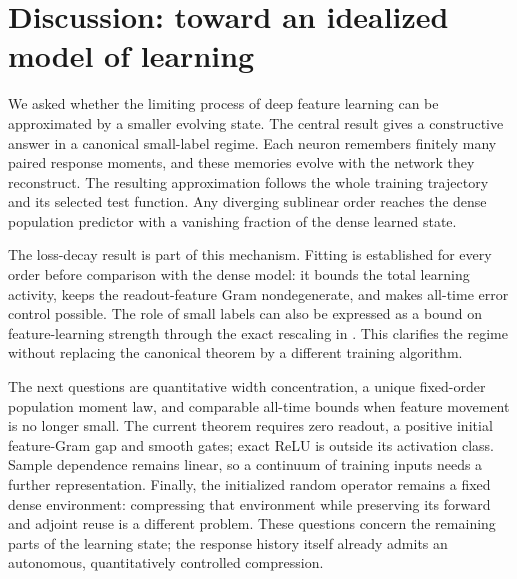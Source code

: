 \documentclass[11pt]{article}
\theoremstyle{definition}
\theoremstyle{remark}
\begin{document}
\section{Discussion: toward an idealized model of learning}

We asked whether the limiting process of deep feature learning can be
approximated by a smaller evolving state.  The central result gives a
constructive answer in a canonical small-label regime.  Each neuron remembers
finitely many paired response moments, and these memories evolve with the
network they reconstruct.  The resulting approximation follows the whole
training trajectory and its selected test function.  Any diverging sublinear
order reaches the dense population predictor with a vanishing fraction of
the dense learned state.

The loss-decay result is part of this mechanism.  Fitting is established for
every order before comparison with the dense model: it bounds the total
learning activity, keeps the readout-feature Gram nondegenerate, and makes
all-time error control possible.  The role of small labels can also be
expressed as a bound on feature-learning strength through the exact
rescaling in .  This clarifies the regime without replacing
the canonical theorem by a different training algorithm.

The next questions are quantitative width concentration, a unique
fixed-order population moment law, and comparable all-time bounds when
feature movement is no longer small.  The current theorem requires zero
readout, a positive initial feature-Gram gap and smooth gates; exact ReLU
is outside its activation class.  Sample dependence remains linear, so a
continuum of training inputs needs a further representation.  Finally,
the initialized random operator remains a fixed dense environment:
compressing that environment while preserving its forward and adjoint reuse
is a different problem.  These questions concern the remaining parts of
the learning state; the response history itself already admits an
autonomous, quantitatively controlled compression.
\end{document}
